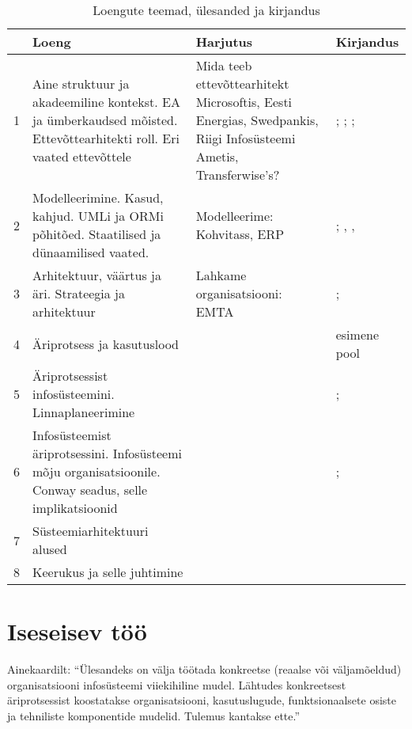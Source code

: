 \documentclass[nobib]{tufte-handout}
\begin{document}
\renewcommand{\arraystretch}{1.3}
\begin{table*}[ht]
\small
	\centering
	\selectfont
	\begin{tabular}{lp{5cm}p{6cm}p{4cm}}
		\toprule
		& Loeng & Harjutus & Kirjandus\\
		\midrule
		1 & Aine struktuur ja akadeemiline kontekst. EA ja ümberkaudsed mõisted. Ettevõttearhitekti roll. Eri vaated ettevõttele & Mida teeb ettevõttearhitekt Microsoftis, Eesti Energias, Swedpankis, Riigi Infosüsteemi Ametis, Transferwise's?  & \cite{parsons2005enterprise}; \cite{hickey}; \cite{sysengineering}; \cite{winter2006essential}\\
		2 & Modelleerimine. Kasud, kahjud. UMLi ja ORMi põhitõed. Staatilised ja dünaamilised vaated. & Modelleerime: Kohvitass, ERP & \cite{OPM}; \cite{heumann2005introduction}, \cite{box1976science}, \cite[peatükk 3]{ferenvcik2004survey}\\
		3 & Arhitektuur, väärtus ja äri. Strateegia ja arhitektuur & Lahkame organisatsiooni: EMTA & \cite{gadiesh2001transforming}; \cite{senge2002leader}\\
		4 & Äriprotsess ja kasutuslood & & \cite{checkland2000soft} esimene pool \\
		5 & Äriprotsessist infosüsteemini. Linnaplaneerimine & & \cite{wohed2006suitability}\cite{longepe2003enterprise}; \cite{bertin2014urbanization}\\
		6 & Infosüsteemist äriprotsessini. Infosüsteemi mõju organisatsioonile. Conway seadus, selle implikatsioonid & & \cite{conway1968committees}; \cite{maccormack2012exploring}\\
		7 & Süsteemiarhitektuuri alused & & \cite{crawley2015system}\\
		8 & Keerukus ja selle juhtimine & & \cite{holt2017so}\\
		\bottomrule
	\end{tabular}
	\caption{Loengute teemad, ülesanded ja kirjandus}
	\label{tab:content}
\end{table*}

\section{Iseseisev töö}
Ainekaardilt: \enquote{Ülesandeks on välja töötada konkreetse (reaalse või väljamõeldud) organisatsiooni infosüsteemi viiekihiline mudel. Lähtudes konkreetsest äriprotsessist koostatakse organisatsiooni, kasutuslugude, funktsionaalsete osiste ja tehniliste komponentide mudelid. Tulemus kantakse ette.}
\end{document}
